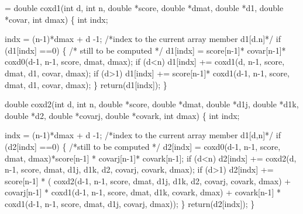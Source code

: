 \documentclass{article}
\begin{document}
\begin{nwchunk}
=
 double coxd1(int d, int n, double *score, double *dmat, double *d1,
              double *covar, int dmax) \{
     int indx;
     
     indx = (n-1)*dmax + d -1;  /*index to the current array member d1[d.n]*/
     if (d1[indx] ==0) \{ /* still to be computed */
         d1[indx] = score[n-1]* covar[n-1]* coxd0(d-1, n-1, score, dmat, dmax);
         if (d<n) d1[indx] += coxd1(d, n-1, score, dmat, d1, covar, dmax);
         if (d>1) d1[indx] += score[n-1]*
                         coxd1(d-1, n-1, score, dmat, d1, covar, dmax);
     \}
     return(d1[indx]);
 \}
 
 double coxd2(int d, int n, double *score, double *dmat, double *d1j,
              double *d1k, double *d2, double *covarj, double *covark,
              int dmax) \{
     int indx;
     
     indx = (n-1)*dmax + d -1;  /*index to the current array member d1[d,n]*/
     if (d2[indx] ==0) \{ /*still to be computed */
         d2[indx] = coxd0(d-1, n-1, score, dmat, dmax)*score[n-1] *
             covarj[n-1]* covark[n-1];
         if (d<n) d2[indx] += coxd2(d, n-1, score, dmat, d1j, d1k, d2, covarj, 
                                   covark, dmax);
         if (d>1) d2[indx] += score[n-1] * (
             coxd2(d-1, n-1, score, dmat, d1j, d1k, d2, covarj, covark, dmax) +
             covarj[n-1] * coxd1(d-1, n-1, score, dmat, d1k, covark, dmax) +
             covark[n-1] * coxd1(d-1, n-1, score, dmat, d1j, covarj, dmax));
         \}
     return(d2[indx]);
 \}
\end{nwchunk}
    
\end{document}

